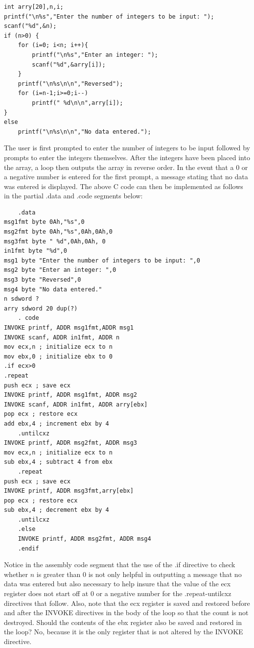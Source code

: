 \documentclass[10pt]{article}
\begin{document}
\begin{verbatim}
int arry[20],n,i;
printf("\n%s","Enter the number of integers to be input: ");
scanf("%d",&n);
if (n>0) {
    for (i=0; i<n; i++){
        printf("\n%s","Enter an integer: ");
        scanf("%d",&arry[i]);
    }
    printf("\n%s\n\n","Reversed");
    for (i=n-1;i>=0;i--)
        printf(" %d\n\n",arry[i]);
}
else
    printf("\n%s\n\n","No data entered.");
\end{verbatim}

The user is first prompted to enter the number of integers to be input followed by prompts to enter the integers themselves. After the integers have been placed into the array, a loop then outputs the array in reverse order. In the event that a 0 or a negative number is entered for the first prompt, a message stating that no data was entered is displayed. The above C code can then be implemented as follows in the partial .data and .code segments below:

\begin{verbatim}
    .data
msg1fmt byte 0Ah,"%s",0
msg2fmt byte 0Ah,"%s",0Ah,0Ah,0
msg3fmt byte " %d",0Ah,0Ah, 0
in1fmt byte "%d",0
msg1 byte "Enter the number of integers to be input: ",0
msg2 byte "Enter an integer: ",0
msg3 byte "Reversed",0
msg4 byte "No data entered."
n sdword ?
arry sdword 20 dup(?)
    . code
INVOKE printf, ADDR msg1fmt,ADDR msg1
INVOKE scanf, ADDR in1fmt, ADDR n
mov ecx,n ; initialize ecx to n
mov ebx,0 ; initialize ebx to 0
.if ecx>0
.repeat
push ecx ; save ecx
INVOKE printf, ADDR msg1fmt, ADDR msg2
INVOKE scanf, ADDR in1fmt, ADDR arry[ebx]
pop ecx ; restore ecx
add ebx,4 ; increment ebx by 4
    .untilcxz
INVOKE printf, ADDR msg2fmt, ADDR msg3
mov ecx,n ; initialize ecx to n
sub ebx,4 ; subtract 4 from ebx
    .repeat
push ecx ; save ecx
INVOKE printf, ADDR msg3fmt,arry[ebx]
pop ecx ; restore ecx
sub ebx,4 ; decrement ebx by 4
    .untilcxz
    .else
    INVOKE printf, ADDR msg2fmt, ADDR msg4
    .endif
\end{verbatim}

Notice in the assembly code segment that the use of the .if directive to check whether $n$ is greater than 0 is not only helpful in outputting a message that no data was entered but also necessary to help insure that the value of the ecx register does not start off at 0 or a negative number for the .repeat-untilcxz directives that follow. Also, note that the ecx register is saved and restored before and after the INVOKE directives in the body of the loop so that the count is not destroyed. Should the contents of the ebx register also be saved and restored in the loop? No, because it is the only register that is not altered by the INVOKE directive.
\end{document}
